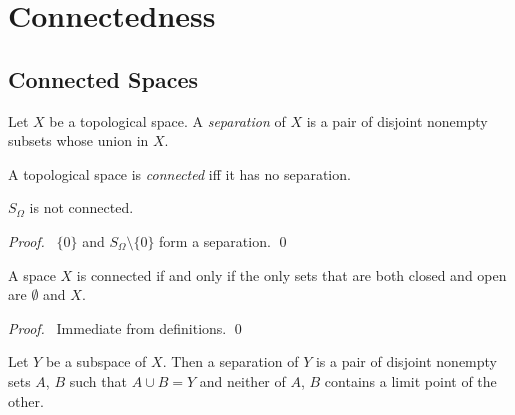 \chapter{Connectedness}

\section{Connected Spaces}

\begin{df}[Separation]
  Let $X$ be a topological space. A \emph{separation} of $X$ is a pair of
  disjoint nonempty subsets whose union in $X$.
\end{df}

\begin{df}[Connected]
  A topological space is \emph{connected} iff it has no separation.
\end{df}

\begin{prop}
 $S_\Omega$ is not connected.
\end{prop}

\begin{proof}
  \pf\ $\{ 0 \}$ and $S_\Omega \setminus \{ 0 \}$ form a separation. \qed
\end{proof}

\begin{prop}
  A space $X$ is connected if and only if the only sets that are both closed
  and open are $\emptyset$ and $X$.
\end{prop}

\begin{proof}
  \pf\ Immediate from definitions. \qed
\end{proof}

\begin{prop}
  Let $Y$ be a subspace of $X$. Then a separation of $Y$ is a pair of
  disjoint
  nonempty sets $A$, $B$ such that $A \cup B = Y$ and neither of $A$, $B$
  contains a limit point of the other.
\end{prop}

